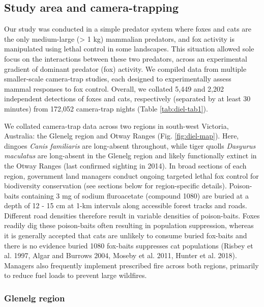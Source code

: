 \documentclass[preprint, 3p, authoryear]{elsarticle} %
\begin{document}
\hypertarget{study-area-and-camera-trapping}{%
\subsection{Study area and camera-trapping}\label{study-area-and-camera-trapping}}

Our study was conducted in a simple predator system where foxes and cats are the only medium-large (\textgreater{} 1 kg) mammalian predators, and fox activity is manipulated using lethal control in some landscapes. This situation allowed sole focus on the interactions between these two predators, across an experimental gradient of dominant predator (fox) activity. We compiled data from multiple smaller-scale camera-trap studies, each designed to experimentally assess mammal responses to fox control. Overall, we collated 5,449 and 2,202 independent detections of foxes and cats, respectively (separated by at least 30 minutes) from 172,052 camera-trap nights (Table \ref{tab:diel-tab1}).

We collated camera-trap data across two regions in south-west Victoria, Australia: the Glenelg region and Otway Ranges (Fig. \ref{fig:diel-map}). Here, dingoes \emph{Canis familiaris} are long-absent throughout, while tiger quolls \emph{Dasyurus maculatus} are long-absent in the Glenelg region and likely functionally extinct in the Otway Ranges (last confirmed sighting in 2014). In broad sections of each region, government land managers conduct ongoing targeted lethal fox control for biodiversity conservation (see sections below for region-specific details). Poison-baits containing 3 mg of sodium fluroacetate (compound 1080) are buried at a depth of 12 - 15 cm at 1-km intervals along accessible forest tracks and roads. Different road densities therefore result in variable densities of poison-baits. Foxes readily dig these poison-baits often resulting in population suppression, whereas it is generally accepted that cats are unlikely to consume buried fox-baits and there is no evidence buried 1080 fox-baits suppresses cat populations (Risbey et al. 1997, Algar and Burrows 2004, Moseby et al. 2011, Hunter et al. 2018). Managers also frequently implement prescribed fire across both regions, primarily to reduce fuel loads to prevent large wildfires.

\hypertarget{glenelg-region}{%
\subsubsection{Glenelg region}\label{glenelg-region}}
\end{document}
